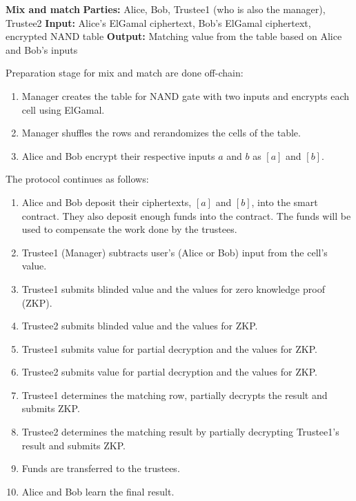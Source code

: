 \begin{mdframed}
 	\textbf{Mix and match}
 	\newline
 	 \newline
 	\textbf{Parties: } Alice, Bob, Trustee1 (who is also the manager), Trustee2 
 	 \newline
 	\textbf{Input: } Alice's ElGamal ciphertext, Bob's ElGamal ciphertext, encrypted NAND table 
 	\newline
 	\textbf{Output: } Matching value from the table based on Alice and Bob's inputs
 	\newline
 	
	Preparation stage for mix and match are done off-chain:
	\begin{enumerate}
		\item Manager creates the table for NAND gate with two inputs and encrypts each cell using ElGamal. 
		\item Manager shuffles the rows and rerandomizes the cells of the table.
		\item Alice and Bob encrypt their respective inputs $a$ and $b$ as $[a]$ and $[b]$.
	\end{enumerate}

 	The protocol continues as follows:
 	\begin{enumerate}
 		\item Alice and Bob deposit their ciphertexts, $[a]$ and $[b]$, into the smart contract. They also deposit enough funds into the contract. The funds will be used to compensate the work done by the trustees.
 		\item Trustee1 (Manager) subtracts user's (Alice or Bob) input from the cell's value.
 		\item Trustee1 submits blinded value and the values for zero knowledge proof (ZKP).
 		\item Trustee2 submits blinded value and the values for ZKP.
 		\item Trustee1 submits value for partial decryption and the values for ZKP.
 		\item Trustee2 submits value for partial decryption and the values for ZKP.
 		\item Trustee1 determines the matching row, partially decrypts the result and submits ZKP.
 		\item Trustee2  determines the matching result by partially decrypting Trustee1's result and submits ZKP.
 		\item Funds are transferred to the trustees.
 		\item Alice and Bob learn the final result.
 	\end{enumerate}
\end{mdframed}

